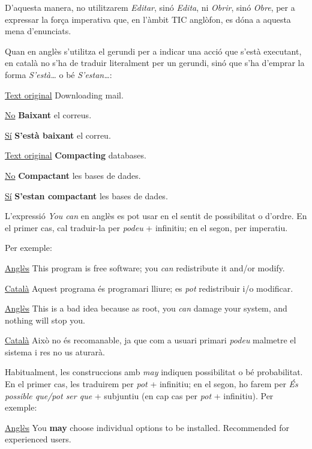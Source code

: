 \documentclass[9pt]{cheatsheet}
\begin{document}
\begin{multicols*}{3}
D'aquesta manera, no utilitzarem \emph{Editar}, sinó \emph{Edita}, ni \emph{Obrir}, sinó \emph{Obre}, per a expressar la força imperativa que, en l'àmbit TIC anglòfon, es dóna a aquesta mena d'enunciats.


Quan en anglès s’utilitza el gerundi per a indicar una acció que s’està executant, en català no s’ha de traduir literalment per un gerundi, sinó que s’ha d’emprar la forma \emph{S'està…} o bé \emph{S'estan…}:

\underline {Text original} Downloading mail.

\underline {No} \textbf{Baixant} el correus.

\underline {Sí} \textbf{S'està baixant} el correu.


\underline {Text original} \textbf{Compacting} databases.

\underline {No} \textbf{Compactant} les bases de dades.

\underline {Sí} \textbf{S'estan compactant} les bases de dades.



L'expressió \emph{You can} en anglès es pot usar en el sentit de possibilitat o d'ordre. En el primer cas, cal traduir-la per \emph{podeu} + infinitiu; en el segon, per imperatiu.

Per exemple:

\underline {Anglès} This program is free software; you \emph{can} redistribute it and/or modify.

\underline {Català} Aquest programa és programari lliure; es \emph{pot} redistribuir i/o modificar.

\underline {Anglès} This is a bad idea because as root, you \emph{can} damage your system, and nothing will stop you.

\underline {Català} Això no és recomanable, ja que com a usuari primari \emph{podeu} malmetre el sistema i res no us aturarà.



Habitualment, les construccions amb \emph{may} indiquen possibilitat o bé probabilitat. En el primer cas, les traduirem per \emph{pot} + infinitiu; en el segon, ho farem per \emph{És possible que/pot ser que} + subjuntiu (en cap cas per \emph{pot} + infinitiu). Per exemple:

\underline {Anglès} You \textbf{may} choose individual options to be installed. Recommended for experienced users.


\end{multicols*}
\end{document}
